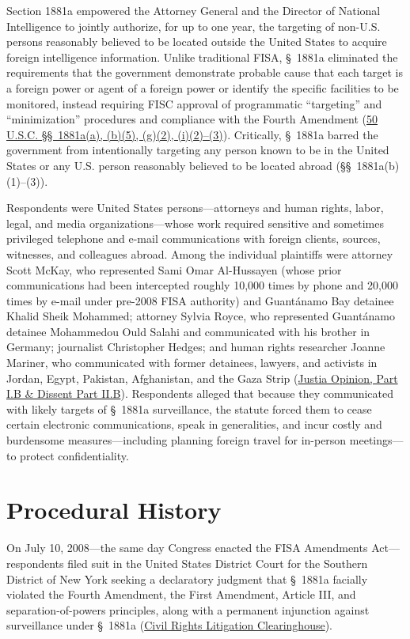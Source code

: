 \documentclass[12pt]{article}
\begin{document}
Section 1881a empowered the Attorney General and the Director of National Intelligence to jointly authorize, for up to one year, the targeting of non-U.S. persons reasonably believed to be located outside the United States to acquire foreign intelligence information. Unlike traditional FISA, \S~1881a eliminated the requirements that the government demonstrate probable cause that each target is a foreign power or agent of a foreign power or identify the specific facilities to be monitored, instead requiring FISC approval of programmatic ``targeting'' and ``minimization'' procedures and compliance with the Fourth Amendment (\href{https://supreme.justia.com/cases/federal/us/568/398/}{50 U.S.C. \S\S~1881a(a), (b)(5), (g)(2), (i)(2)--(3)}). Critically, \S~1881a barred the government from intentionally targeting any person known to be in the United States or any U.S. person reasonably believed to be located abroad (\S\S~1881a(b)(1)--(3)).

Respondents were United States persons---attorneys and human rights, labor, legal, and media organizations---whose work required sensitive and sometimes privileged telephone and e-mail communications with foreign clients, sources, witnesses, and colleagues abroad. Among the individual plaintiffs were attorney Scott McKay, who represented Sami Omar Al-Hussayen (whose prior communications had been intercepted roughly 10,000 times by phone and 20,000 times by e-mail under pre-2008 FISA authority) and Guant\'anamo Bay detainee Khalid Sheik Mohammed; attorney Sylvia Royce, who represented Guant\'anamo detainee Mohammedou Ould Salahi and communicated with his brother in Germany; journalist Christopher Hedges; and human rights researcher Joanne Mariner, who communicated with former detainees, lawyers, and activists in Jordan, Egypt, Pakistan, Afghanistan, and the Gaza Strip (\href{https://supreme.justia.com/cases/federal/us/568/398/}{Justia Opinion, Part I.B \& Dissent Part II.B}). Respondents alleged that because they communicated with likely targets of \S~1881a surveillance, the statute forced them to cease certain electronic communications, speak in generalities, and incur costly and burdensome measures---including planning foreign travel for in-person meetings---to protect confidentiality.

\section{Procedural History}

On July 10, 2008---the same day Congress enacted the FISA Amendments Act---respondents filed suit in the United States District Court for the Southern District of New York seeking a declaratory judgment that \S~1881a facially violated the Fourth Amendment, the First Amendment, Article III, and separation-of-powers principles, along with a permanent injunction against surveillance under \S~1881a (\href{https://clearinghouse.net/case/12972/}{Civil Rights Litigation Clearinghouse}).
\end{document}
